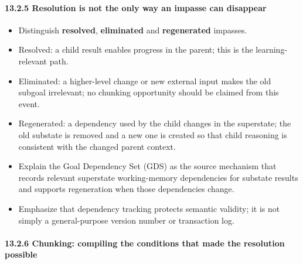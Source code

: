 \paragraph{13.2.5 Resolution is not the only way an impasse can disappear}\label{resolution-is-not-the-only-way-an-impasse-can-disappear}

\begin{itemize}
\tightlist
\item
  Distinguish \textbf{resolved}, \textbf{eliminated} and \textbf{regenerated} impasses.
\item
  Resolved: a child result enables progress in the parent; this is the learning-relevant path.
\item
  Eliminated: a higher-level change or new external input makes the old subgoal irrelevant; no chunking opportunity should be claimed from this event.
\item
  Regenerated: a dependency used by the child changes in the superstate; the old substate is removed and a new one is created so that child reasoning is consistent with the changed parent context.
\item
  Explain the Goal Dependency Set (GDS) as the source mechanism that records relevant superstate working-memory dependencies for substate results and supports regeneration when those dependencies change.
\item
  Emphasize that dependency tracking protects semantic validity; it is not simply a general-purpose version number or transaction log.
\end{itemize}

\paragraph{13.2.6 Chunking: compiling the conditions that made the resolution possible}\label{chunking-compiling-the-conditions-that-made-the-resolution-possible}

